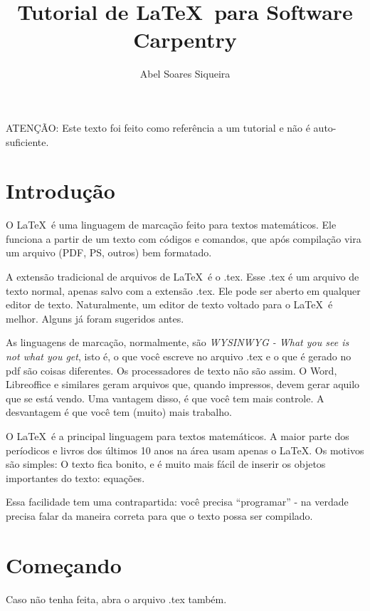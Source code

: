 \documentclass{article}
\author{Abel Soares Siqueira}
\title{Tutorial de \LaTeX\ para Software Carpentry}
\date{}
\begin{document}
\maketitle

\begin{center}
  \bf
\begin{minipage}{0.7\textwidth}
ATENÇÃO: Este texto foi feito como referência a um tutorial e não é
auto-suficiente.
\end{minipage}
\end{center}

\section{Introdução}

O \LaTeX\ é uma linguagem de marcação feito para textos matemáticos.
Ele funciona a partir de um texto com códigos e comandos, que após
compilação vira um arquivo (PDF, PS, outros) bem formatado.

A extensão tradicional de arquivos de \LaTeX\ é o .tex. Esse .tex é um
arquivo de texto normal, apenas salvo com a extensão .tex. Ele pode ser
aberto em qualquer editor de texto.
Naturalmente, um editor de texto voltado para o \LaTeX\ é melhor.
Alguns já foram sugeridos antes.

As linguagens de marcação, normalmente, são \emph{WYSINWYG - What you
see is not what you get}, isto é, o que você escreve no arquivo .tex e
o que é gerado no pdf são coisas diferentes.
Os processadores de texto não são assim. O Word, Libreoffice e
similares geram arquivos que, quando impressos, devem gerar aquilo que
se está vendo.
Uma vantagem disso, é que você tem mais controle. A desvantagem é que
você tem (muito) mais trabalho.

O \LaTeX\ é a principal linguagem para textos matemáticos. A maior
parte dos períodicos e livros dos últimos 10 anos na área usam apenas o
\LaTeX. Os motivos são simples: O texto fica bonito, e é muito mais
fácil de inserir os objetos importantes do texto: equações.

Essa facilidade tem uma contrapartida: você precisa ``programar'' - na
verdade precisa falar da maneira correta para que o texto possa ser
compilado.

\section{Começando}

Caso não tenha feita, abra o arquivo .tex também.
\end{document}
